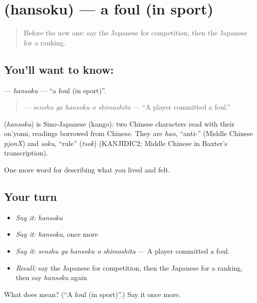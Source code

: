 \section[\texorpdfstring{\ja{はんそく} (hansoku)}{はんそく (hansoku)}]{ (hansoku) — a foul (in sport)}

\label{lesson:JA-C462-hansoku}



\begin{quote}
Before the new one: say the Japanese for competition, then the Japanese for a ranking.
\end{quote}

\subsection*{You'll want to know: }
\textbf{} — \emph{hansoku} — \textquotedblleft{}a foul (in sport)\textquotedblright{}.

\begin{quote}
\textbf{  } — \emph{senshu ga hansoku o shimashita} — \textquotedblleft{}A player committed a foul.\textquotedblright{}
\end{quote}

\begin{cousinweb}
\textbf{} (\emph{hansoku}) is Sino-Japanese (kango): two Chinese characters read with their on'yomi, readings borrowed from Chinese. They are \emph{han}, \textquotedblleft{}anti-\textquotedblright{} (Middle Chinese \emph{pjonX}) and \emph{soku}, \textquotedblleft{}rule\textquotedblright{} (\emph{tsok}) (KANJIDIC2; Middle Chinese in Baxter's transcription).
\end{cousinweb}

\begin{grammarlens}[title={What you've built}]
One more word for describing what you lived and felt.
\end{grammarlens}

\subsection*{Your turn}
\begin{itemize}
\raggedright
  \item \emph{Say it:} \emph{hansoku}
  \item \emph{Say it:} \emph{hansoku}, once more
  \item \emph{Say it:} \emph{senshu ga hansoku o shimashita} — A player committed a foul.
  \item \emph{Recall:} say the Japanese for competition, then the Japanese for a ranking, then say \emph{hansoku} again
\end{itemize}

\begin{tcolorbox}[breakable,colback=teal!4,colframe=teal!35!black,title={Before you move on}]
What does  mean? (\textquotedblleft{}A foul (in sport)\textquotedblright{}.) Say it once more.
\end{tcolorbox}
